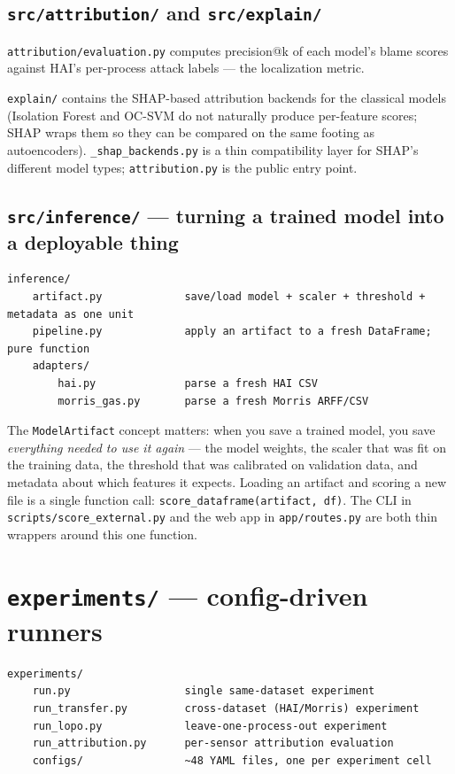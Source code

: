 \documentclass[11pt,a4paper]{article}
\newcommand{\code}[1]{\texttt{#1}}
\begin{document}
\subsection{\texttt{src/attribution/} and \texttt{src/explain/}}

\code{attribution/evaluation.py} computes precision@k of each model's blame scores against HAI's per-process attack labels --- the localization metric.

\code{explain/} contains the SHAP-based attribution backends for the classical models (Isolation Forest and OC-SVM do not naturally produce per-feature scores; SHAP wraps them so they can be compared on the same footing as autoencoders). \code{\_shap\_backends.py} is a thin compatibility layer for SHAP's different model types; \code{attribution.py} is the public entry point.

\subsection{\texttt{src/inference/} --- turning a trained model into a deployable thing}

\begin{Verbatim}
inference/
    artifact.py             save/load model + scaler + threshold + metadata as one unit
    pipeline.py             apply an artifact to a fresh DataFrame; pure function
    adapters/
        hai.py              parse a fresh HAI CSV
        morris_gas.py       parse a fresh Morris ARFF/CSV
\end{Verbatim}

The \code{ModelArtifact} concept matters: when you save a trained model, you save \emph{everything needed to use it again} --- the model weights, the scaler that was fit on the training data, the threshold that was calibrated on validation data, and metadata about which features it expects. Loading an artifact and scoring a new file is a single function call: \code{score\_dataframe(artifact, df)}. The CLI in \code{scripts/score\_external.py} and the web app in \code{app/routes.py} are both thin wrappers around this one function.

\section{\texttt{experiments/} --- config-driven runners}

\begin{Verbatim}
experiments/
    run.py                  single same-dataset experiment
    run_transfer.py         cross-dataset (HAI/Morris) experiment
    run_lopo.py             leave-one-process-out experiment
    run_attribution.py      per-sensor attribution evaluation
    configs/                ~48 YAML files, one per experiment cell
\end{Verbatim}
\end{document}
